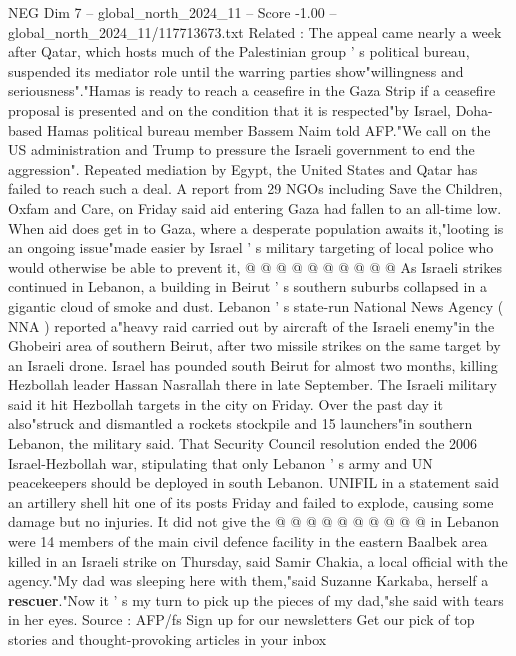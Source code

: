 \begin{textsample}{NEG Dim 7 – global\_north\_2024\_11 – Score -1.00 – global\_north\_2024\_11/117713673.txt}  \label{ex:f7_neg_340}
Related : The appeal came nearly a week after Qatar, which hosts much of the Palestinian group ' s political bureau, suspended its mediator role until the warring parties show"willingness and seriousness"."Hamas is ready to reach a ceasefire in the Gaza Strip if a ceasefire proposal is presented and on the condition that it is respected"by Israel, Doha-based Hamas political bureau member Bassem Naim told AFP."We call on the US administration and Trump to pressure the Israeli government to end the aggression".
Repeated mediation by Egypt, the United States and Qatar has failed to reach such a deal.
A report from 29 NGOs including Save the Children, Oxfam and Care, on Friday said aid entering Gaza had fallen to an all-time low.
When aid does get in to Gaza, where a desperate population awaits it,"looting is an ongoing issue"made easier by Israel ' s military targeting of local police who would otherwise be able to prevent it, @ @ @ @ @ @ @ @ @ @ As Israeli strikes continued in Lebanon, a building in Beirut ' s southern suburbs collapsed in a gigantic cloud of smoke and dust.
Lebanon ' s state-run National News Agency ( NNA ) reported a"heavy raid carried out by aircraft of the Israeli enemy"in the Ghobeiri area of southern Beirut, after two missile strikes on the same target by an Israeli drone.
Israel has pounded south Beirut for almost two months, killing Hezbollah leader Hassan Nasrallah there in late September.
The Israeli military said it hit Hezbollah targets in the city on Friday.
Over the past day it also"struck and dismantled a rockets stockpile and 15 launchers"in southern Lebanon, the military said.
That Security Council resolution ended the 2006 Israel-Hezbollah war, stipulating that only Lebanon ' s army and UN peacekeepers should be deployed in south Lebanon.
UNIFIL in a statement said an artillery shell hit one of its posts Friday and failed to explode, causing some damage but no injuries.
It did not give the @ @ @ @ @ @ @ @ @ @ in Lebanon were 14 members of the main civil defence facility in the eastern Baalbek area killed in an Israeli strike on Thursday, said Samir Chakia, a local official with the agency."My dad was sleeping here with them,"said Suzanne Karkaba, herself a \textbf{rescuer}."Now it ' s my turn to pick up the pieces of my dad,"she said with tears in her eyes.
Source : AFP/fs Sign up for our newsletters Get our pick of top stories and thought-provoking articles in your inbox

\end{textsample}
